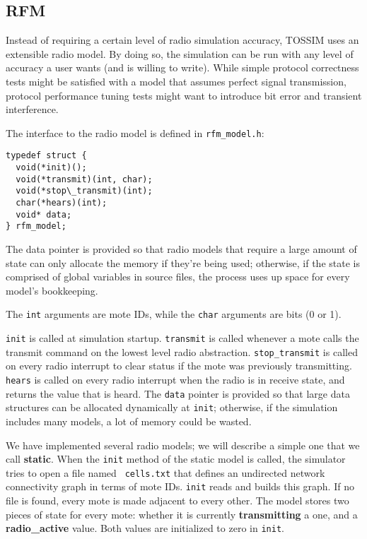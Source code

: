 \documentclass[12pt]{article}
\begin{document}
\subsection*{RFM}

Instead of requiring a certain level of radio simulation accuracy,
TOSSIM uses an extensible radio model. By doing so, the simulation can
be run with any level of accuracy a user wants (and is willing to
write). While simple protocol correctness tests might be satisfied
with a model that assumes perfect signal transmission, protocol
performance tuning tests might want to introduce bit error and
transient interference.

The interface to the radio model is defined in {\tt rfm\_model.h}:

\begin{verbatim}
typedef struct {
  void(*init)();
  void(*transmit)(int, char);
  void(*stop\_transmit)(int);
  char(*hears)(int);
  void* data;
} rfm_model;
\end{verbatim}

The data pointer is provided so that radio models that require a large
amount of state can only allocate the memory if they're being used;
otherwise, if the state is comprised of global variables in source
files, the process uses up space for every model's bookkeeping.

The {\tt int} arguments are mote IDs, while the {\tt char} arguments
are bits (0 or 1).

{\tt init} is called at simulation startup. {\tt transmit} is called
whenever a mote calls the transmit command on the lowest level radio
abstraction. {\tt stop\_transmit} is called on every radio interrupt
to clear status if the mote was previously transmitting. {\tt hears}
is called on every radio interrupt when the radio is in receive state,
and returns the value that is heard. The {\tt data} pointer is
provided so that large data structures can be allocated dynamically at
{\tt init}; otherwise, if the simulation includes many models, a lot
of memory could be wasted.

We have implemented several radio models; we will describe a simple
one that we call {\bf static}. When the {\tt init} method of the
static model is called, the simulator tries to open a file named {\tt
cells.txt} that defines an undirected network connectivity graph in
terms of mote IDs. {\tt init} reads and builds this graph. If no file
is found, every mote is made adjacent to every other. The model stores
two pieces of state for every mote: whether it is currently {\bf
transmitting }a one, and a {\bf radio\_active} value. Both values are
initialized to zero in {\tt init}.
\end{document}

